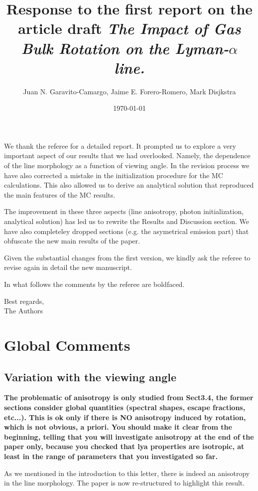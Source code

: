 \documentclass[12pt]{article}
\title{Response to the first report on the article draft \emph{The
    Impact of Gas Bulk Rotation on the Lyman-$\alpha$ line.}}
\author{Juan N. Garavito-Camargo, Jaime E. Forero-Romero, Mark Disjkstra}
\date{\today}
\begin{document}
\maketitle
We thank the referee for a detailed report. It prompted us to explore
a very important aspect of our results that we had overlooked. Namely,
the dependence of the line morphology as a function of viewing
angle. In the revision process we have also corrected a mistake in the
initialization procedure for the MC calculations. This also allowed us
to derive an analytical solution that reproduced the main features of
the MC results.  
  
The improvement in these three aspects (line anisotropy, photon initialization,
analytical solution) has led us to rewrite the Results and Discussion
section. We have also completeley dropped sections (e.g. the asymetrical emission
part) that obfuscate the new main results of the paper.

Given the substantial changes from the first version, 
we kindly ask the referee to revise again in detail the new manuscript. 

In what follows the comments by the referee are boldfaced.

Best regards, \\

The Authors\\




\section{Global Comments}

\subsection{Variation with the viewing angle}

{\bf The problematic of anisotropy is only studied from Sect3.4, the former
sections consider global quantities (spectral shapes, escape
fractions, etc...). This is ok only if there is NO anisotropy induced
by rotation, which is not obvious, a priori. You should make it clear
from the beginning, telling that you will investigate anisotropy at
the end of the paper only, because you checked that lya properties are
isotropic, at least in the range of parameters that you investigated
so far.}

As we mentioned in the introduction to this letter, there is indeed
an anisotropy in the line morphology. The paper is now re-structured
to highlight this result.
\end{document}
